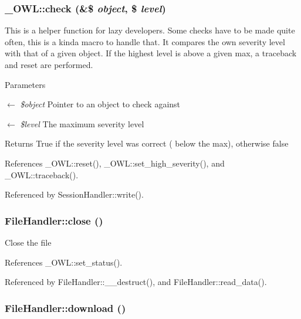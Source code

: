 \subsubsection[{check}]{\setlength{\rightskip}{0pt plus 5cm}\_\-OWL::check (\&\$ {\em object}, \/  \$ {\em level})}\label{class__OWL_ad6f4f6946f40199dd0333cf219fa500e}
This is a helper function for lazy developers. Some checks have to be made quite often, this is a kinda macro to handle that. It compares the own severity level with that of a given object. If the highest level is above a given max, a traceback and reset are performed.


\begin{DoxyParams}{Parameters}
\item[\mbox{$\leftarrow$} {\em \$object}]Pointer to an object to check against \item[\mbox{$\leftarrow$} {\em \$level}]The maximum severity level \end{DoxyParams}
\begin{DoxyReturn}{Returns}
True if the severity level was correct ( below the max), otherwise false 
\end{DoxyReturn}


References \_\-OWL::reset(), \_\-OWL::set\_\-high\_\-severity(), and \_\-OWL::traceback().



Referenced by SessionHandler::write().

\subsubsection[{close}]{\setlength{\rightskip}{0pt plus 5cm}FileHandler::close ()}\label{classFileHandler_aa48e7c3b67346e29b194d2f0ac5dd1f8}
Close the file 

References \_\-OWL::set\_\-status().



Referenced by FileHandler::\_\-\_\-destruct(), and FileHandler::read\_\-data().

\subsubsection[{download}]{\setlength{\rightskip}{0pt plus 5cm}FileHandler::download ()}\label{classFileHandler_ac17edc9b92643c32ae6040b1235c64dd}
